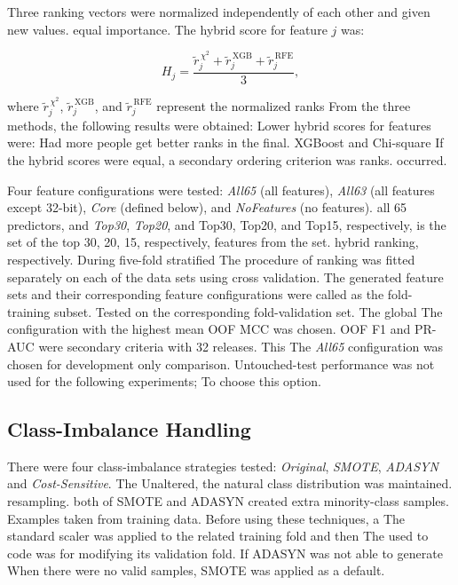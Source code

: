 \documentclass[conference]{IEEEtran}
\begin{document}
Three ranking vectors were normalized independently of each other and given new values.
equal importance. The hybrid score for feature \(j\) was:

\begin{equation}
H_j =
\frac{
\widetilde{r}_{j}^{\,\chi^2} +
\widetilde{r}_{j}^{\,\mathrm{XGB}} +
\widetilde{r}_{j}^{\,\mathrm{RFE}}
}{3},
\end{equation}

where \(\widetilde{r}_{j}^{\,\chi^2}\),
\(\widetilde{r}_{j}^{\,\mathrm{XGB}}\), and
\(\widetilde{r}_{j}^{\,\mathrm{RFE}}\) represent the normalized ranks
From the three methods, the following results were obtained: Lower hybrid scores for features were:
Had more people get better ranks in the final. XGBoost and Chi-square
If the hybrid scores were equal, a secondary ordering criterion was ranks.
occurred.

Four feature configurations were tested: \textit{All65} (all features), \textit{All63} (all features except 32-bit), \textit{Core} (defined below), and \textit{NoFeatures} (no features).
all 65 predictors, and \textit{Top30}, \textit{Top20}, and
Top30, Top20, and Top15, respectively, is the set of the top 30, 20, 15, respectively, features from the set.
hybrid ranking, respectively. During five-fold stratified
The procedure of ranking was fitted separately on each of the data sets using cross validation.
The generated feature sets and their corresponding feature configurations were called as the fold-training subset.
Tested on the corresponding fold-validation set. The global
The configuration with the highest mean OOF MCC was chosen.
OOF F1 and PR-AUC were secondary criteria with 32 releases. This
The \textit{All65} configuration was chosen for development only comparison.
Untouched-test performance was not used for the following experiments;
To choose this option.


\subsection{Class-Imbalance Handling}
\label{subsec:class-imbalance}

There were four class-imbalance strategies tested: \textit{Original},
\textit{SMOTE}, \textit{ADASYN} and \textit{Cost-Sensitive}. The
Unaltered, the natural class distribution was maintained.
resampling. both of SMOTE and ADASYN created extra minority-class samples.
Examples taken from training data. Before using these techniques, a
The standard scaler was applied to the related training fold and then
The used to code was for modifying its validation fold. If ADASYN was not able to generate
When there were no valid samples, SMOTE was applied as a default.
\end{document}
